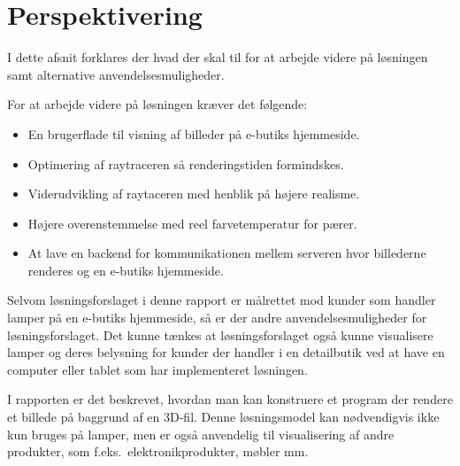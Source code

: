 \section{Perspektivering}
I dette afsnit forklares der hvad der skal til for at arbejde videre på løsningen samt alternative anvendelsesmuligheder. 

For at arbejde videre på løsningen kræver det følgende:

\begin{itemize}
\item En brugerflade til visning af billeder på e-butiks hjemmeside.
\item Optimering af raytraceren så renderingstiden formindskes. 
\item Viderudvikling af raytaceren med henblik på højere realisme.
\item Højere overenstemmelse med reel farvetemperatur for pærer.  
\item At lave en backend for kommunikationen mellem serveren hvor billederne renderes og en e-butiks hjemmeside.
\end{itemize}

Selvom løsningsforslaget i denne rapport er målrettet mod kunder som handler lamper på en e-butiks hjemmeside, så er der andre anvendelsesmuligheder for løsningsforslaget. Det kunne tænkes at løsningsforslaget også kunne visualisere lamper og deres belysning for kunder der handler i en detailbutik ved at have en computer eller tablet som har implementeret løsningen. 

I rapporten er det beskrevet, hvordan man kan konstruere et program der rendere et billede på baggrund af en 3D-fil. Denne løsningsmodel kan nødvendigvis ikke kun bruges på lamper, men er også anvendelig til visualisering af andre produkter, som f.eks.\ elektronikprodukter, møbler mm.\ 






\clearpage